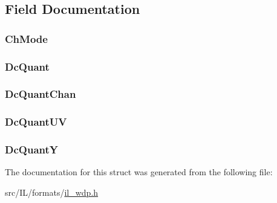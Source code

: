 \subsection{Field Documentation}
\hypertarget{struct_w_d_p_d_c_q_u_a_n_t_a50bf9a72224995705039b34880c92570}{
\subsubsection[{Ch\-Mode}]{ Ch\-Mode}}\label{struct_w_d_p_d_c_q_u_a_n_t_a50bf9a72224995705039b34880c92570}
\hypertarget{struct_w_d_p_d_c_q_u_a_n_t_a2a29e5b8722edd71c08f139c6baaaf46}{
\subsubsection[{Dc\-Quant}]{ Dc\-Quant}}\label{struct_w_d_p_d_c_q_u_a_n_t_a2a29e5b8722edd71c08f139c6baaaf46}
\hypertarget{struct_w_d_p_d_c_q_u_a_n_t_a4057d18c80e52b627b6eb00c64677ffe}{
\subsubsection[{Dc\-Quant\-Chan}]{ Dc\-Quant\-Chan}}\label{struct_w_d_p_d_c_q_u_a_n_t_a4057d18c80e52b627b6eb00c64677ffe}
\hypertarget{struct_w_d_p_d_c_q_u_a_n_t_ab0a55f898fcae0cecc94f9e2932e2ce8}{
\subsubsection[{Dc\-Quant\-U\-V}]{ Dc\-Quant\-U\-V}}\label{struct_w_d_p_d_c_q_u_a_n_t_ab0a55f898fcae0cecc94f9e2932e2ce8}
\hypertarget{struct_w_d_p_d_c_q_u_a_n_t_a3e5645c73e3d370e605c3cad68a853d6}{
\subsubsection[{Dc\-Quant\-Y}]{ Dc\-Quant\-Y}}\label{struct_w_d_p_d_c_q_u_a_n_t_a3e5645c73e3d370e605c3cad68a853d6}


The documentation for this struct was generated from the following file\-:\begin{DoxyCompactItemize}
\item 
src/\-I\-L/formats/\hyperlink{il__wdp_8h}{il\-\_\-wdp.\-h}\end{DoxyCompactItemize}
